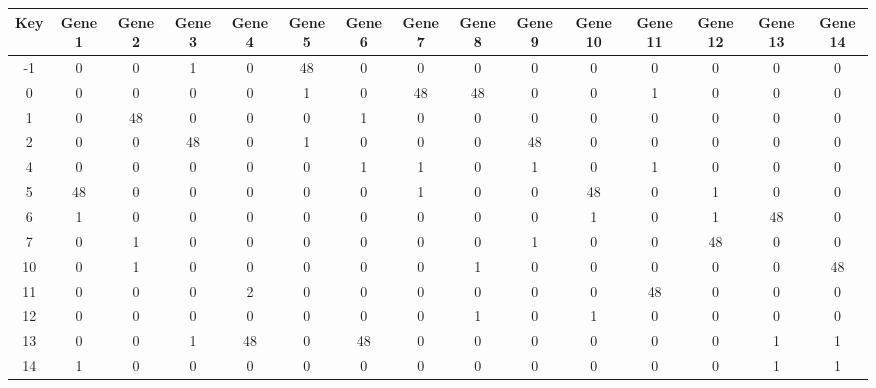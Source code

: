 \begin{tabular}{|c|c|c|c|c|c|c|c|c|c|c|c|c|c|c|}
\hline
Key & Gene 1 & Gene 2 & Gene 3 & Gene 4 & Gene 5 & Gene 6 & Gene 7 & Gene 8 & Gene 9 & Gene 10 & Gene 11 & Gene 12 & Gene 13 & Gene 14 \\
\hline
-1 & 0 & 0 & 1 & 0 & 48 & 0 & 0 & 0 & 0 & 0 & 0 & 0 & 0 & 0 \\
0 & 0 & 0 & 0 & 0 & 1 & 0 & 48 & 48 & 0 & 0 & 1 & 0 & 0 & 0 \\
1 & 0 & 48 & 0 & 0 & 0 & 1 & 0 & 0 & 0 & 0 & 0 & 0 & 0 & 0 \\
2 & 0 & 0 & 48 & 0 & 1 & 0 & 0 & 0 & 48 & 0 & 0 & 0 & 0 & 0 \\
4 & 0 & 0 & 0 & 0 & 0 & 1 & 1 & 0 & 1 & 0 & 1 & 0 & 0 & 0 \\
5 & 48 & 0 & 0 & 0 & 0 & 0 & 1 & 0 & 0 & 48 & 0 & 1 & 0 & 0 \\
6 & 1 & 0 & 0 & 0 & 0 & 0 & 0 & 0 & 0 & 1 & 0 & 1 & 48 & 0 \\
7 & 0 & 1 & 0 & 0 & 0 & 0 & 0 & 0 & 1 & 0 & 0 & 48 & 0 & 0 \\
10 & 0 & 1 & 0 & 0 & 0 & 0 & 0 & 1 & 0 & 0 & 0 & 0 & 0 & 48 \\
11 & 0 & 0 & 0 & 2 & 0 & 0 & 0 & 0 & 0 & 0 & 48 & 0 & 0 & 0 \\
12 & 0 & 0 & 0 & 0 & 0 & 0 & 0 & 1 & 0 & 1 & 0 & 0 & 0 & 0 \\
13 & 0 & 0 & 1 & 48 & 0 & 48 & 0 & 0 & 0 & 0 & 0 & 0 & 1 & 1 \\
14 & 1 & 0 & 0 & 0 & 0 & 0 & 0 & 0 & 0 & 0 & 0 & 0 & 1 & 1 \\
\hline
\end{tabular}